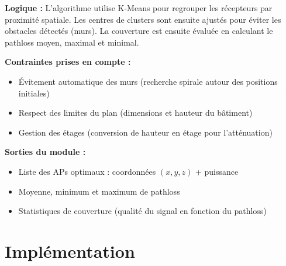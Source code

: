 \documentclass[12pt,a4paper]{article}
\begin{document}
\textbf{Logique :} L’algorithme utilise K-Means pour regrouper les récepteurs par proximité spatiale. Les centres de clusters sont ensuite ajustés pour éviter les obstacles détectés (murs).
La couverture est ensuite évaluée en calculant le pathloss moyen, maximal et minimal.

\textbf{Contraintes prises en compte :}
\begin{itemize}
    \item Évitement automatique des murs (recherche spirale autour des positions initiales)
    \item Respect des limites du plan (dimensions et hauteur du bâtiment)
    \item Gestion des étages (conversion de hauteur en étage pour l'atténuation)
\end{itemize}


\textbf{Sorties du module :}
\begin{itemize}
    \item Liste des APs optimaux : coordonnées $(x, y, z)$ + puissance
    \item Moyenne, minimum et maximum de pathloss
    \item Statistiques de couverture (qualité du signal en fonction du pathloss)
\end{itemize}


\section{Implémentation}
\end{document}
